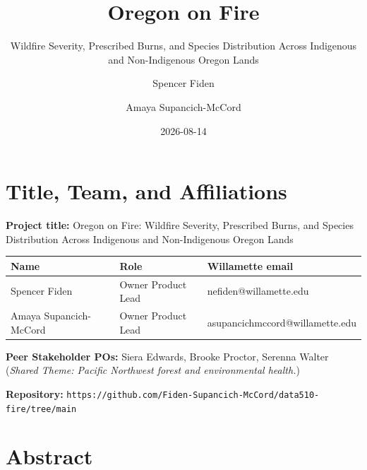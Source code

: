 \documentclass[
  letterpaper,
  DIV=11,
  numbers=noendperiod]{scrartcl}
\title{Oregon on Fire}
\subtitle{Wildfire Severity, Prescribed Burns, and Species Distribution
Across Indigenous and Non-Indigenous Oregon Lands}
\author{Spencer Fiden \and Amaya Supancich-McCord}
\date{2026-08-14}
\newcounter{none} %
\renewcommand*\contentsname{Table of contents}
\newcommand\contentsname{Table of contents}
\begin{document}
\maketitle

\renewcommand*\contentsname{Table of contents}
{
\setcounter{tocdepth}{3}
\tableofcontents
}

\section{Title, Team, and
Affiliations}\label{title-team-and-affiliations}

\textbf{Project title:} Oregon on Fire: Wildfire Severity, Prescribed
Burns, and Species Distribution Across Indigenous and Non-Indigenous
Oregon Lands

{\def\LTcaptype{none} %
\begin{longtable}[]{@{}
  >{\raggedright\arraybackslash}p{}
  >{\raggedright\arraybackslash}p{}
  >{\raggedright\arraybackslash}p{}@{}}
\toprule\noalign{}
\begin{minipage}[b]{\linewidth}\raggedright
Name
\end{minipage} & \begin{minipage}[b]{\linewidth}\raggedright
Role
\end{minipage} & \begin{minipage}[b]{\linewidth}\raggedright
Willamette email
\end{minipage} \\
\midrule\noalign{}
\endhead
\bottomrule\noalign{}
\endlastfoot
Spencer Fiden & Owner Product Lead & nefiden@willamette.edu \\
Amaya Supancich-McCord & Owner Product Lead &
asupancichmccord@willamette.edu \\
\end{longtable}
}

\textbf{Peer Stakeholder POs:} Siera Edwards, Brooke Proctor, Serenna
Walter (\emph{Shared Theme: Pacific Northwest forest and environmental
health.})

\textbf{Repository:}
\texttt{https://github.com/Fiden-Supancich-McCord/data510-fire/tree/main}

\section{Abstract}\label{abstract}
\end{document}

